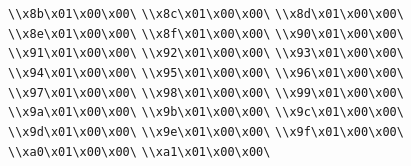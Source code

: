 \verb|\\x8b\x01\x00\x00\|\newline
\verb|\\x8c\x01\x00\x00\|\newline
\verb|\\x8d\x01\x00\x00\|\newline
\verb|\\x8e\x01\x00\x00\|\newline
\verb|\\x8f\x01\x00\x00\|\newline
\verb|\\x90\x01\x00\x00\|\newline
\verb|\\x91\x01\x00\x00\|\newline
\verb|\\x92\x01\x00\x00\|\newline
\verb|\\x93\x01\x00\x00\|\newline
\verb|\\x94\x01\x00\x00\|\newline
\verb|\\x95\x01\x00\x00\|\newline
\verb|\\x96\x01\x00\x00\|\newline
\verb|\\x97\x01\x00\x00\|\newline
\verb|\\x98\x01\x00\x00\|\newline
\verb|\\x99\x01\x00\x00\|\newline
\verb|\\x9a\x01\x00\x00\|\newline
\verb|\\x9b\x01\x00\x00\|\newline
\verb|\\x9c\x01\x00\x00\|\newline
\verb|\\x9d\x01\x00\x00\|\newline
\verb|\\x9e\x01\x00\x00\|\newline
\verb|\\x9f\x01\x00\x00\|\newline
\verb|\\xa0\x01\x00\x00\|\newline
\verb|\\xa1\x01\x00\x00\|\newline
